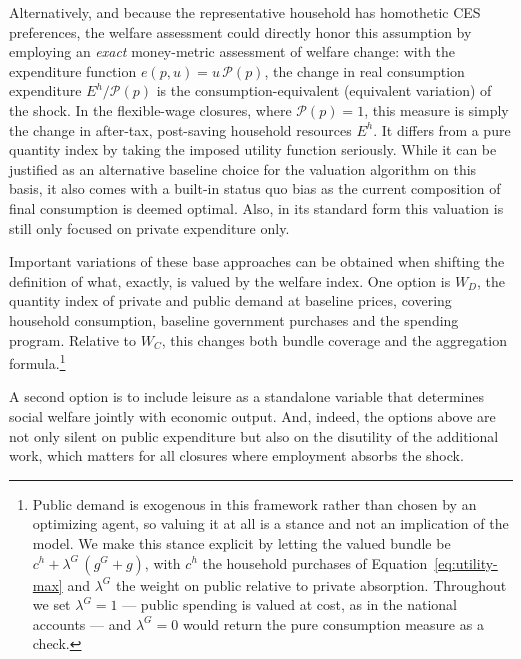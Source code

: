 Alternatively, and because the representative household has homothetic CES preferences, the welfare assessment could directly honor this assumption by employing an \emph{exact} money-metric assessment of welfare change: with the expenditure function $e(p,u)=u\,\mathcal{P}(p)$, the change in real consumption expenditure $E^h/\mathcal{P}(p)$ is the consumption-equivalent (equivalent variation) of the shock. In the flexible-wage closures, where $\mathcal{P}(p)=1$, this measure is simply the change in after-tax, post-saving household resources $E^h$.  It differs from a pure quantity index by taking the imposed utility function seriously.
While it can be justified as an alternative baseline choice for the valuation algorithm on this basis, it also comes with a built-in status quo bias as the current composition of final consumption is deemed optimal. Also, in its standard form this valuation is still only focused on private expenditure only.

Important variations of these base approaches can be obtained when shifting the definition of what, exactly, is valued by the welfare index. One option is $W_D$, the quantity index of private and public demand at baseline prices, covering household consumption, baseline government purchases and the spending program. Relative to $W_C$, this changes both bundle coverage and the aggregation formula.\footnote{Public demand is exogenous in this framework rather than chosen by an optimizing agent, so valuing it at all is a stance and not an implication of the model. We make this stance explicit by letting the valued bundle be $c^h+\lambda^{G}\,(g^G+g)$, with $c^h$ the household purchases of Equation~\eqref{eq:utility-max} and $\lambda^{G}$ the weight on public relative to private absorption. Throughout we set $\lambda^{G}=1$ --- public spending is valued at cost, as in the national accounts --- and $\lambda^{G}=0$ would return the pure consumption measure as a check.} 

A second option is to include leisure as a standalone variable that determines social welfare jointly with economic output. And, indeed, the options above are not only silent on public expenditure but also on the disutility of the additional work, which matters for all closures where employment absorbs the shock.




